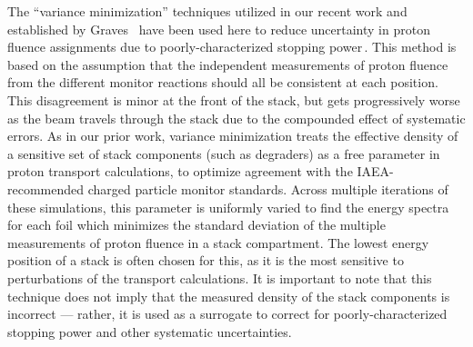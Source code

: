 The \enquote{variance minimization} techniques utilized in our recent work and established by Graves \etal\ have been used here to reduce uncertainty in proton fluence assignments due to poorly-characterized stopping power\,\cite{Voyles2018a,Graves2016}.
This method is based on the assumption that the independent measurements of proton fluence from the different monitor reactions 
should all be consistent at each 
position.
This disagreement is minor at the front of the stack, but gets progressively worse as the beam travels through the stack due to the compounded effect of systematic errors.
As in  our prior work, variance minimization treats the effective density of a sensitive set of stack components (such as degraders) as a free parameter in proton transport calculations, to optimize agreement with the IAEA-recommended charged particle monitor standards.
Across multiple iterations of these simulations, this parameter is uniformly varied to find the energy spectra for each foil which minimizes the standard deviation  of the multiple measurements of proton fluence in a stack compartment.
The lowest energy position of a stack is often chosen for this, as it is the most sensitive to perturbations of the transport calculations.
It is important to note that this technique does not imply that the measured density of the stack components is incorrect --- rather, it is used as a surrogate to correct for poorly-characterized stopping power and other systematic uncertainties.




